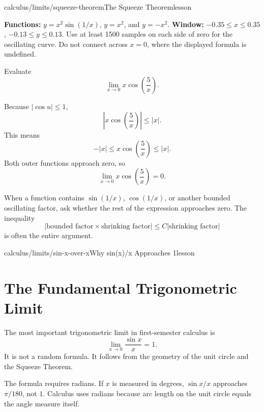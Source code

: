 \begin{webpage}{calculus/limits/squeeze-theorem}{The Squeeze Theorem}{lesson}
\begin{bggraphspec}
\textbf{Functions:} \(y=x^2\sin(1/x)\), \(y=x^2\), and \(y=-x^2\). \textbf{Window:} \(-0.35\le x\le0.35\), \(-0.13\le y\le0.13\). Use at least 1500 samples on each side of zero for the oscillating curve. Do not connect across \(x=0\), where the displayed formula is undefined.
\end{bggraphspec}

\begin{bgexample}[title={Absolute-value squeeze}]
Evaluate
\[
  \lim_{x\to0}x\cos\left(\frac{5}{x}\right).
\]

\begin{bgsolution}
Because \(|\cos u|\le1\),
\[
  \left|x\cos\left(\frac5x\right)\right|
  \le |x|.
\]
This means
\[
  -|x|\le x\cos\left(\frac5x\right)\le|x|.
\]
Both outer functions approach zero, so
\[
  \boxed{\lim_{x\to0}x\cos\left(\frac5x\right)=0}.
\]
\end{bgsolution}
\end{bgexample}

\begin{bghomework}
When a function contains \(\sin(1/x)\), \(\cos(1/x)\), or another bounded oscillating factor, ask whether the rest of the expression approaches zero. The inequality
\[
  |\text{bounded factor}\times\text{shrinking factor}|
  \le C|\text{shrinking factor}|
\]
is often the entire argument.
\end{bghomework}
\end{webpage}

\begin{webpage}{calculus/limits/sin-x-over-x}{Why sin(x)/x Approaches 1}{lesson}
\section{The Fundamental Trigonometric Limit}


The most important trigonometric limit in first-semester calculus is
\[
  \boxed{\lim_{x\to0}\frac{\sin x}{x}=1}.
\]
It is not a random formula. It follows from the geometry of the unit circle and the Squeeze Theorem.

\begin{bgmistake}
The formula requires radians. If \(x\) is measured in degrees, \(\sin x/x\) approaches \(\pi/180\), not \(1\). Calculus uses radians because arc length on the unit circle equals the angle measure itself.
\end{bgmistake}
\end{webpage}

